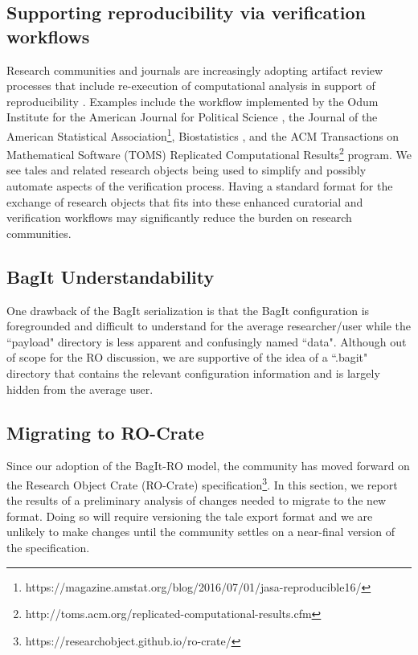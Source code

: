 \documentclass[conference]{IEEEtran}
\begin{document}
\subsection{Supporting reproducibility via verification workflows}
Research communities and journals are increasingly adopting artifact review processes that include re-execution of computational analysis in support of reproducibility \cite{stodden2013b}. Examples include the workflow implemented by the Odum Institute for the American Journal for Political Science \cite{christian2018}, the Journal of the American Statistical Association\footnote{https://magazine.amstat.org/blog/2016/07/01/jasa-reproducible16/}, Biostatistics \cite{donoho2010}, and the ACM Transactions on Mathematical Software (TOMS) Replicated Computational Results\footnote{http://toms.acm.org/replicated-computational-results.cfm} program. We see tales and related research objects being used to simplify and possibly automate aspects of the verification process. Having a standard format for the exchange of research objects that fits into these enhanced curatorial and verification workflows may significantly reduce the burden on research communities.


\subsection{BagIt Understandability}

One drawback of the BagIt serialization is that the BagIt configuration is foregrounded and 
difficult to understand for the average researcher/user while the ``payload" directory is less 
apparent and confusingly named ``data". Although out of scope for the RO discussion, we are 
supportive of the idea of a ``.bagit" directory that contains the relevant configuration 
information and is largely hidden from the average user.


\subsection{Migrating to RO-Crate}
Since our adoption of the BagIt-RO model, the community has moved forward on the Research Object 
Crate (RO-Crate) specification\footnote{https://researchobject.github.io/ro-crate/}. In this section, we report the results of a preliminary analysis 
of changes needed to migrate to the new format. Doing so will require versioning the tale export 
format and we are unlikely to make changes until the community settles on a near-final version of the 
specification.
\end{document}
